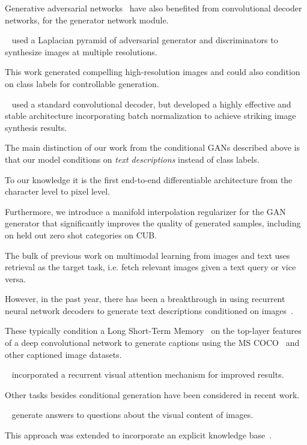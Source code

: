 Generative adversarial networks~\cite{goodfellow2014generative} have also benefited from convolutional decoder networks, for the generator network module.

~\citet{denton2015deep} used a Laplacian pyramid of adversarial generator and discriminators to synthesize images at multiple resolutions.

This work generated compelling high-resolution images and could also condition on class labels for controllable generation.

~\citet{radford2015unsupervised} used a standard convolutional decoder, but developed a highly effective and stable architecture incorporating batch normalization to achieve striking image synthesis results.

The main distinction of our work from the conditional GANs described above is that our model conditions on \emph{text descriptions} instead of class labels.

To our knowledge it is the first end-to-end differentiable architecture from the character level to pixel level.

Furthermore, we introduce a manifold interpolation regularizer for the GAN generator that significantly improves the quality of generated samples, including on held out zero shot categories on CUB. 

The bulk of previous work on multimodal learning from images and text uses retrieval as the target task, i.e. fetch relevant images given a text query or vice versa.

However, in the past year, there has been a breakthrough in using recurrent neural network decoders to generate text descriptions conditioned on images~\citep{vinyals2015show,mao2014deep,KL15,DHGRVSD15}.

These typically condition a Long Short-Term Memory~\cite{hochreiter1997long} on the top-layer features of a deep convolutional network to generate captions using the MS COCO~\cite{lin2014microsoft} and other captioned image datasets.

~\citet{xu2015show} incorporated a recurrent visual attention mechanism for improved results.

Other tasks besides conditional generation have been considered in recent work.

~\citet{ren2015exploring} generate answers to questions about the visual content of images.

This approach was extended to incorporate an explicit knowledge base~\cite{wang2015explicit}.

